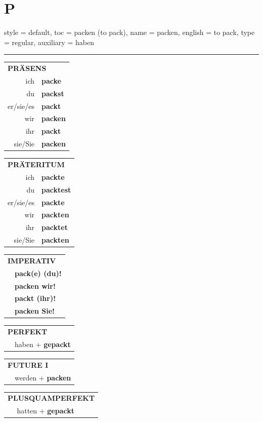 \section{P}

\begin{verbentry}{
  style = {default},
  toc = {packen (to pack)},
  name = {packen},
  english = {to pack},
  type = {regular},
  auxiliary = {haben}
}


\vspace{5pt}
\hrule
\vspace{5pt}

\begin{tabular}{rl}
\multicolumn{2}{l}{\textbf{PRÄSENS}}\\
ich & \textbf{packe}\\
du & \textbf{packst}\\
er/sie/es & \textbf{packt}\\
wir & \textbf{packen}\\
ihr & \textbf{packt}\\
sie/Sie & \textbf{packen}\\
\end{tabular}
\hfill
\begin{tabular}{rl}
\multicolumn{2}{l}{\textbf{PRÄTERITUM}}\\
ich & \textbf{packte}\\
du & \textbf{packtest}\\
er/sie/es & \textbf{packte}\\
wir & \textbf{packten}\\
ihr & \textbf{packtet}\\
sie/Sie & \textbf{packten}\\
\end{tabular}
\hfill
\begin{tabular}{rl}
\multicolumn{2}{l}{\textbf{IMPERATIV}}\\
& \textbf{pack(e) (du)!}\\
& \textbf{packen wir!}\\
& \textbf{packt (ihr)!}\\
& \textbf{packen Sie!}\\
\end{tabular}

\vspace{10pt}

\begin{tabular}{rl}
\multicolumn{2}{l}{\textbf{PERFEKT}}\\
& haben + \textbf{gepackt}\\
\end{tabular}
\hfill
\begin{tabular}{rl}
\multicolumn{2}{l}{\textbf{FUTURE I}}\\
& werden + \textbf{packen}\\
\end{tabular}
\hfill
\begin{tabular}{rl}
\multicolumn{2}{l}{\textbf{PLUSQUAMPERFEKT}}\\
& hatten + \textbf{gepackt}\\
\end{tabular}


\end{verbentry}

